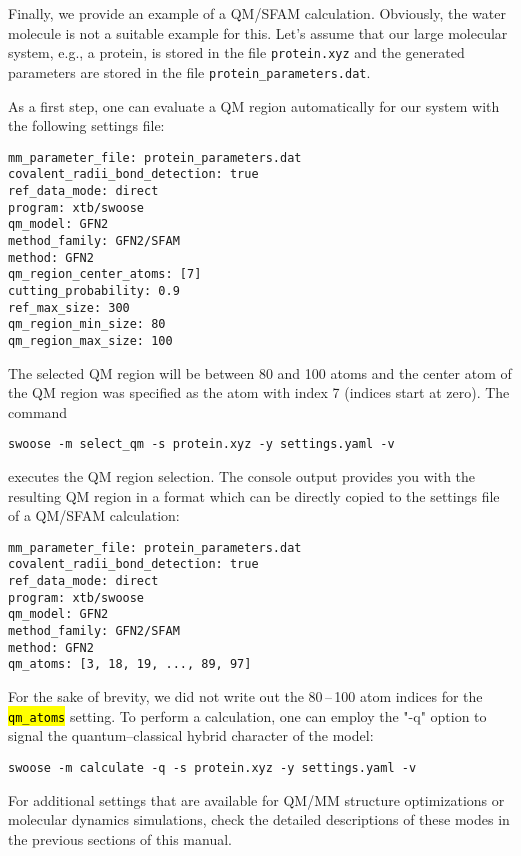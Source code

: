 \documentclass[]{tufte-book}
\begin{document}
{{Finally, we provide an example of a QM/SFAM calculation. Obviously, the water molecule is not a suitable example for this. Let's assume that our large molecular system, e.g., a protein, is stored in the file \texttt{protein.xyz} and the generated parameters are stored in the file \texttt{protein\_parameters.dat}.

As a first step, one can evaluate a QM region automatically for our system with the following settings file:
\begin{mdframed}[backgroundcolor=LightSteelBlue!25, linewidth=0pt]
\begin{verbatim}
mm_parameter_file: protein_parameters.dat
covalent_radii_bond_detection: true
ref_data_mode: direct
program: xtb/swoose
qm_model: GFN2
method_family: GFN2/SFAM
method: GFN2
qm_region_center_atoms: [7]
cutting_probability: 0.9
ref_max_size: 300
qm_region_min_size: 80
qm_region_max_size: 100
\end{verbatim}
\end{mdframed}
The selected QM region will be between 80 and 100 atoms and the center atom of the QM region was specified as the atom with index 7 (indices start at zero).
The command
\begin{mdframed}[backgroundcolor=LightSteelBlue!25, linewidth=0pt]
\begin{verbatim}
swoose -m select_qm -s protein.xyz -y settings.yaml -v
\end{verbatim}
\end{mdframed}
executes the QM region selection. The console output provides you with the resulting QM region in a format which can be directly copied to the settings file of a QM/SFAM calculation:
\begin{mdframed}[backgroundcolor=LightSteelBlue!25, linewidth=0pt]
\begin{verbatim}
mm_parameter_file: protein_parameters.dat
covalent_radii_bond_detection: true
ref_data_mode: direct
program: xtb/swoose
qm_model: GFN2
method_family: GFN2/SFAM
method: GFN2
qm_atoms: [3, 18, 19, ..., 89, 97]
\end{verbatim}
\end{mdframed}
For the sake of brevity, we did not write out the 80\,--\,100 atom indices for the \hl{\texttt{qm\_atoms}} setting. To perform a calculation, one can employ the "-q" option to signal the quantum--classical hybrid character of the model:
\begin{mdframed}[backgroundcolor=LightSteelBlue!25, linewidth=0pt]
\begin{verbatim}
swoose -m calculate -q -s protein.xyz -y settings.yaml -v
\end{verbatim}
\end{mdframed}
For additional settings that are available for QM/MM structure optimizations or molecular dynamics simulations, check the detailed descriptions of these modes in the previous sections of this manual.


}}
\end{document}
